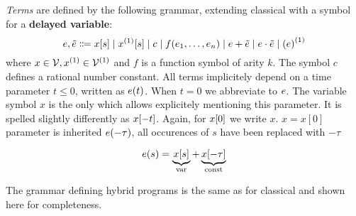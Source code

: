 
    \begin{definition}[Terms]\label{def:syntax-terms}
        \emph{Terms} are defined by the following grammar, extending classical \dL with a symbol for a \textbf{delayed variable}:
        \begin{equation}
            \astrm,\bstrm \Coloneqq
                \xtau[s] \mid
                \Dxtau[s] \mid
                c \mid
                f(\range{\istrm{1}}{\istrm{n}}) \mid
                \astrm+\bstrm \mid
                \astrm\cdot\bstrm \mid
                \D{(\astrm)}
        \end{equation}
        where $x\in\allvars,\D{x}\in\diffvars$ and $f$ is a function symbol of arity $k$.
        The symbol $c$ defines a rational number constant.
        All terms implicitely depend on a time parameter $t\leq 0$, written as $e(t)$. When $t=0$ we abbreviate to $e$. The variable symbol $x$ is the only which allows explicitely mentioning this parameter. It is spelled slightly differently as $x[-t]$. Again, for $x[0]$ we write $x$.
        $x=x[0]$
        parameter is inherited
        $e(-\tau)$, all occurences of $s$ have been replaced with $-\tau$


    \end{definition}

    \begin{example}
        \begin{equation}
            e(s) = \underbrace{x[s]}_{\text{var}} + \underbrace{x[-\tau]}_{\text{const}}
        \end{equation}
    \end{example}

    The grammar defining hybrid programs is the same as for classical \dL and shown here for completeness.

